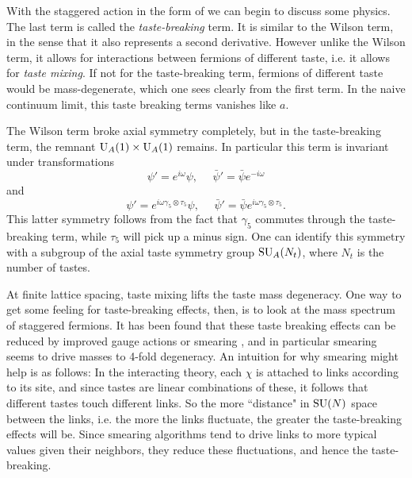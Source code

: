With the staggered action in the form of  we can
begin to discuss some physics. The last term is called the
{\it taste-breaking} term. It is similar to the Wilson term, in the
sense that it also represents a second derivative. However unlike
the Wilson term, it allows for interactions between fermions of
different taste, i.e. it allows for {\it taste mixing}. If not for
the taste-breaking term, fermions of different taste would be mass-degenerate,
which one sees clearly from the first term. In the naive continuum limit,
this taste breaking terms vanishes like $a$.

The Wilson term broke axial symmetry completely, but in the taste-breaking
term, the remnant $\operatorname{U}_A(1)\times\operatorname{U}_A(1)$ remains. In particular this
term is invariant under transformations
\begin{equation}
\psi'=e^{i\omega}\psi, ~~~~~~
          \bar{\psi}'=\bar{\psi}e^{-i\omega}
\end{equation}
and
\begin{equation}
   \psi'=e^{i\omega\gamma_5\otimes\tau_5}\psi, ~~~~~~
          \bar{\psi}'=\bar{\psi}e^{i\omega\gamma_5\otimes\tau_5}.
\end{equation}
This latter symmetry follows from the fact that $\gamma_5$ commutes through
the taste-breaking term, while $\tau_5$ will pick up a minus sign.
One can identify this symmetry with a subgroup of the axial taste
symmetry group $\operatorname{SU}_A(N_t)$, where $N_t$ is the number of tastes.

At finite lattice spacing, taste mixing lifts the taste mass degeneracy.
One way to get some feeling for taste-breaking effects, then, is to look
at the mass spectrum of staggered fermions. It has been found that these
taste breaking effects can be reduced by improved gauge actions or smearing
\cite{durr_staggered_2004,follana_index_2004}, and in particular smearing
seems to drive masses to 4-fold degeneracy. An intuition for why smearing
might help is as follows: In the interacting theory, each $\chi$ is attached
to links according to its site, and since tastes are linear combinations
of these, it follows that different tastes touch different links. So
the more ``distance" in $\operatorname{SU}(N)$ space between the links, i.e. the more
the links fluctuate, the greater the taste-breaking effects will be.
Since smearing algorithms tend to drive links to more typical values
given their neighbors, they reduce these fluctuations, and hence
the taste-breaking.

